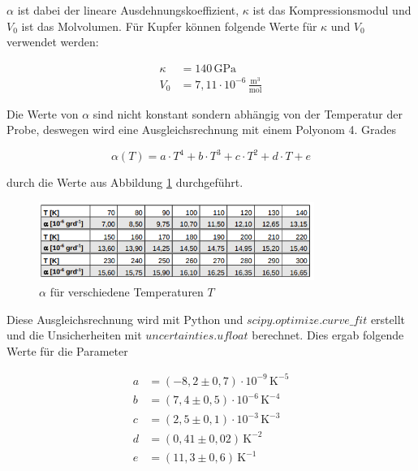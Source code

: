 $\alpha$ ist dabei der lineare Ausdehnungskoeffizient, $\kappa$ \cite{kappa} ist das Kompressionsmodul und $V_0$ \cite{V0} ist das Molvolumen. Für Kupfer können folgende Werte für $\kappa$ und $V_0$ verwendet werden:

\begin{align*}
    \kappa &= 140 \, \mathrm{GPa} \\
    V_0 &= 7, \! 11 \cdot 10^{-6} \, \frac{\mathrm{m}^3}{\mathrm{mol}}
\end{align*}

Die Werte von $\alpha$ sind nicht konstant sondern abhängig von der Temperatur der Probe, deswegen wird eine Ausgleichsrechnung mit einem Polyonom 4. Grades

\begin{equation}
    \alpha (T) = a \cdot T^4 + b \cdot T^3 + c \cdot T^2 + d \cdot T + e
    \label{eq:alpha}
\end{equation}

durch die Werte aus Abbildung \ref{fig:alpha} durchgeführt.

\begin{figure}
    \centering
    \includegraphics[width=0.8\textwidth]{build/alpha.PNG}
    \caption{$\alpha$ für verschiedene Temperaturen $T$ \cite{Anleitung}}
    \label{fig:alpha}
\end{figure}

Diese Ausgleichsrechnung wird mit Python und $scipy.optimize.curve\_fit$ erstellt und die Unsicherheiten mit $uncertainties.ufloat$ berechnet. Dies ergab folgende Werte für die Parameter

\begin{align*}
    a &= (-8, \! 2 \pm 0, \! 7) \cdot 10^{-9} \, \mathrm{K}^{-5} \\
    b &= (7, \! 4 \pm 0, \! 5) \cdot 10^{-6} \, \mathrm{K}^{-4} \\
    c &= (2, \! 5 \pm 0, \! 1) \cdot 10^{-3} \, \mathrm{K}^{-3} \\
    d &= (0, \! 41 \pm 0, \! 02) \, \mathrm{K}^{-2} \\
    e &= (11, \! 3 \pm 0, \! 6) \, \mathrm{K}^{-1}
\end{align*}

